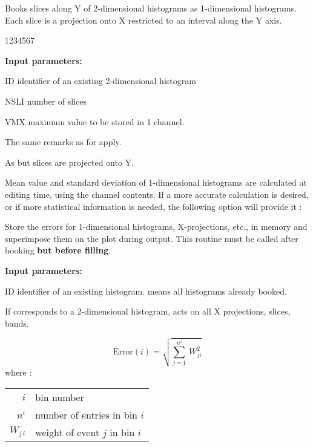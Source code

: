 \Action Books slices along Y of 2-dimensional histograms as
 1-dimensional histograms.\\
Each slice is a projection onto X restricted to an interval
along the Y axis.

\begin{DLtt}{1234567}
\item[{\rm\bf Input parameters:}]
\item[ID]   identifier of an existing 2-dimensional histogram
\item[NSLI] number of slices
\item[VMX]  maximum value to be stored in 1 channel.
\end{DLtt}
 
The same remarks as for  apply.
\medskip


\Action As  but slices are projected onto Y.

Mean value and standard deviation of 1-dimensional histograms
are calculated at editing time, using the channel contents. 
If a more accurate calculation is desired, or if more 
statistical information is needed, the
following option will provide it :
\medskip


\Action Store the errors for 1-dimensional histograms, X-projections, 
etc., in memory and superimpose them on the plot during output.
This routine must be called after booking {\bf but before filling}.

\begin{DLtt}{12}
\item[{\rm\bf Input parameters:}]
\item[ID] identifier of an existing histogram.
           means all histograms already booked.
\end{DLtt}

If  corresponds to a 2-dimensional histogram,
 acts on all X projections, slices, bands.

\[\mbox{Error}(i) = \sqrt{\sum_{j=1}^{{n^{i}}}\, W_{{ji}}^{2}} \]
where :\qquad\begin{tabular}[t]{r@{\quad}l}
               $i$        & bin number                     \\
               $n^i$      & number of entries in bin $i$   \\
               $W_{j\,i}$ & weight of event $j$ in bin $i$ \\
              \end{tabular}
\NODOC{\end{minipage}}

